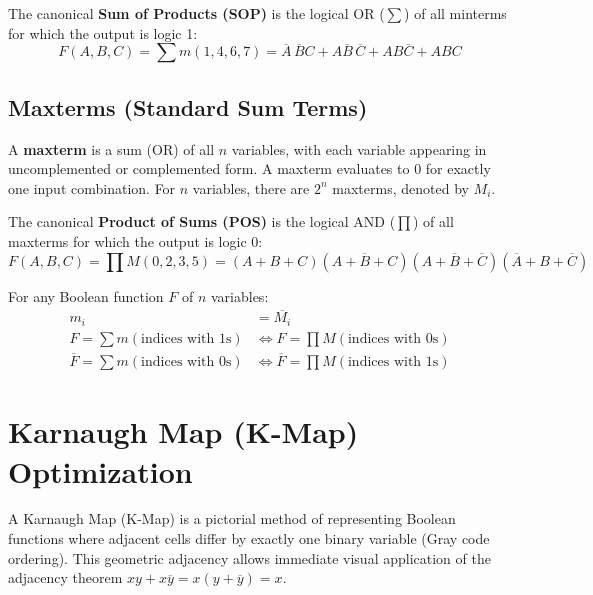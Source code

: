 The canonical \textbf{Sum of Products (SOP)} is the logical OR ($\sum$) of all minterms for which the output is logic 1:
\begin{equation}
F(A, B, C) = \sum m(1, 4, 6, 7) = \overline{A}\,\overline{B}C + A\overline{B}\,\overline{C} + AB\overline{C} + ABC
\end{equation}

\subsection{Maxterms (Standard Sum Terms)}
A \textbf{maxterm} is a sum (OR) of all $n$ variables, with each variable appearing in uncomplemented or complemented form. A maxterm evaluates to 0 for exactly one input combination.
For $n$ variables, there are $2^n$ maxterms, denoted by $M_i$.

The canonical \textbf{Product of Sums (POS)} is the logical AND ($\prod$) of all maxterms for which the output is logic 0:
\begin{equation}
F(A, B, C) = \prod M(0, 2, 3, 5) = (A+B+C)(A+\overline{B}+C)(A+\overline{B}+\overline{C})(\overline{A}+B+\overline{C})
\end{equation}

\begin{conceptbox}
For any Boolean function $F$ of $n$ variables:
\begin{align}
m_i &= \overline{M_i} \\
F = \sum m(\text{indices with 1s}) &\iff F = \prod M(\text{indices with 0s}) \\
\overline{F} = \sum m(\text{indices with 0s}) &\iff \overline{F} = \prod M(\text{indices with 1s})
\end{align}
\end{conceptbox}

\section{Karnaugh Map (K-Map) Optimization}
A Karnaugh Map (K-Map) is a pictorial method of representing Boolean functions where adjacent cells differ by exactly one binary variable (Gray code ordering). This geometric adjacency allows immediate visual application of the adjacency theorem $x y + x \overline{y} = x(y+\overline{y}) = x$.

